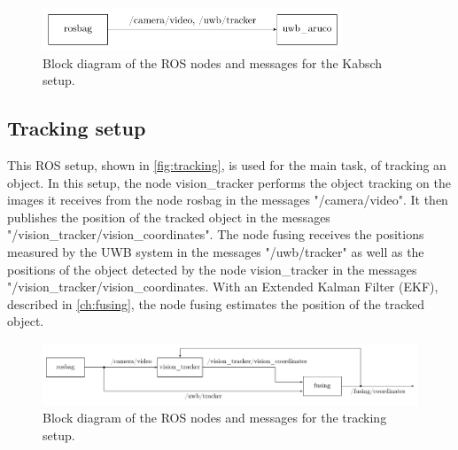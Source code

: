 \begin{figure}[ht!]\centering
	\includegraphics[width=0.8\textwidth]{figures/blockdiagram_kabsch}
	\caption{Block diagram of the \ac{ROS} nodes and messages for the Kabsch setup.}\label{fig:kabsch}
\end{figure}

\subsection{Tracking setup}\label{subsec:tracking}
This \ac{ROS} setup, shown in \autoref{fig:tracking}, is used for the main task, of tracking an object. In this setup, the node vision\_tracker performs the object tracking on the images it receives from the node rosbag in the messages "/camera/video". It then publishes the position of the tracked object in the messages "/vision\_tracker/vision\_coordinates". The node fusing receives the positions measured by the \ac{UWB} system in the messages "/uwb/tracker" as well as the positions of the object detected by the node vision\_tracker in the messages "/vision\_tracker/vision\_coordinates. With an Extended Kalman Filter (EKF), described in \autoref{ch:fusing}, the node fusing estimates the position of the tracked object.

\begin{figure}[ht!]\centering
	\includegraphics[width=1.0\textwidth]{figures/blockdiagram_tracking}
	\caption{Block diagram of the \ac{ROS} nodes and messages for the tracking setup.}\label{fig:tracking}
\end{figure}
